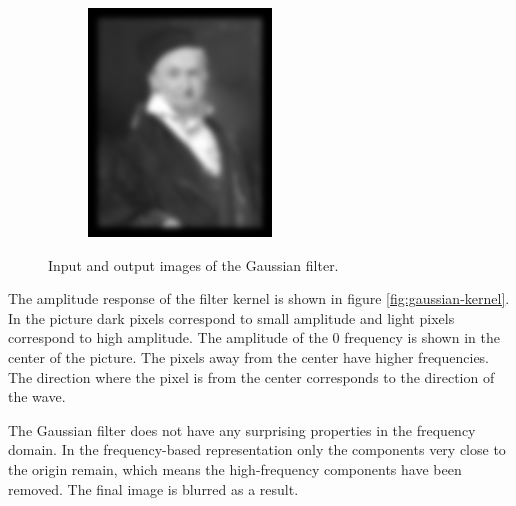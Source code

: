 \documentclass[]{article}
\begin{document}
\begin{figure}
\begin{subfigure}[t]{0.49\textwidth}
      \includegraphics[width=0.99\linewidth]{output.png}
    \end{subfigure}
    \caption{Input and output images of the Gaussian filter.}
\end{figure}

The amplitude response of the filter kernel is shown in figure
\ref{fig:gaussian-kernel}. In the picture dark pixels correspond to small
amplitude and light pixels correspond to high amplitude. The amplitude of the 0
frequency is shown in the center of the picture. The pixels away from the center
have higher frequencies. The direction where the pixel is from the center
corresponds to the direction of the wave.

The Gaussian filter does not have any surprising properties in the frequency
domain. In the frequency-based representation only the components very close to
the origin remain, which means the high-frequency components have been removed.
The final image is blurred as a result.
\end{document}
